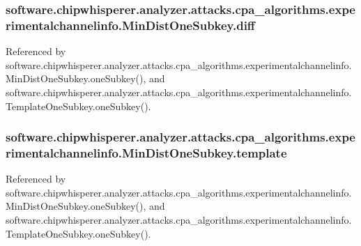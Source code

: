 \subsubsection[{diff}]{\setlength{\rightskip}{0pt plus 5cm}software.\+chipwhisperer.\+analyzer.\+attacks.\+cpa\+\_\+algorithms.\+experimentalchannelinfo.\+Min\+Dist\+One\+Subkey.\+diff}\label{classsoftware_1_1chipwhisperer_1_1analyzer_1_1attacks_1_1cpa__algorithms_1_1experimentalchannelinfo_1_1MinDistOneSubkey_afcce723f81b229edec5bd5057122bf86}


Referenced by software.\+chipwhisperer.\+analyzer.\+attacks.\+cpa\+\_\+algorithms.\+experimentalchannelinfo.\+Min\+Dist\+One\+Subkey.\+one\+Subkey(), and software.\+chipwhisperer.\+analyzer.\+attacks.\+cpa\+\_\+algorithms.\+experimentalchannelinfo.\+Template\+One\+Subkey.\+one\+Subkey().

\hypertarget{classsoftware_1_1chipwhisperer_1_1analyzer_1_1attacks_1_1cpa__algorithms_1_1experimentalchannelinfo_1_1MinDistOneSubkey_a32436420d3e4d3bf68c485dfc14100f9}{}
\subsubsection[{template}]{\setlength{\rightskip}{0pt plus 5cm}software.\+chipwhisperer.\+analyzer.\+attacks.\+cpa\+\_\+algorithms.\+experimentalchannelinfo.\+Min\+Dist\+One\+Subkey.\+template}\label{classsoftware_1_1chipwhisperer_1_1analyzer_1_1attacks_1_1cpa__algorithms_1_1experimentalchannelinfo_1_1MinDistOneSubkey_a32436420d3e4d3bf68c485dfc14100f9}


Referenced by software.\+chipwhisperer.\+analyzer.\+attacks.\+cpa\+\_\+algorithms.\+experimentalchannelinfo.\+Min\+Dist\+One\+Subkey.\+one\+Subkey(), and software.\+chipwhisperer.\+analyzer.\+attacks.\+cpa\+\_\+algorithms.\+experimentalchannelinfo.\+Template\+One\+Subkey.\+one\+Subkey().

\hypertarget{classsoftware_1_1chipwhisperer_1_1analyzer_1_1attacks_1_1cpa__algorithms_1_1experimentalchannelinfo_1_1MinDistOneSubkey_abbc316bb21caa52a556a2bf1b7c82eca}{}
